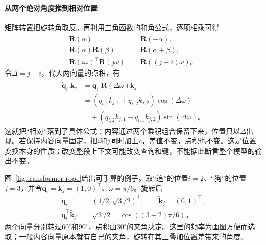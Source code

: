 \paragraph{从两个绝对角度推到相对位置}
矩阵转置把旋转角取反。再利用三角函数的和角公式，逐项相乘可得
\begin{equation}
  \begin{aligned}
    \bm R(\alpha)^{\top}&=\bm R(-\alpha),\\
    \bm R(\alpha)\bm R(\beta)&=\bm R(\alpha+\beta),\\
    \bm R(i\omega)^{\top}\bm R(j\omega)
      &=\bm R((j-i)\omega)\text{。}
  \end{aligned}
  \label{eq:transformer-rope-composition}
\end{equation}
令$\Delta=j-i$，代入两向量的点积，有
\begin{equation}
  \begin{aligned}
    \widetilde{\bm q}_i^{\top}\widetilde{\bm k}_j
      &=\bm q_i^{\top}\bm R(\Delta\omega)\bm k_j\\
      &=(q_{i,1}k_{j,1}+q_{i,2}k_{j,2})\cos(\Delta\omega)\\
      &\quad +(q_{i,2}k_{j,1}-q_{i,1}k_{j,2})\sin(\Delta\omega)\text{。}
  \end{aligned}
  \label{eq:transformer-rope-two-dimensional}
\end{equation}
这就把“相对”落到了具体公式：内容通过两个乘积组合保留下来，位置只以$\Delta$出现。若保持内容向量固定，把$i$和$j$同时加上$c$，差值不变，点积也不变。这是位置变换本身的性质；改变整段上下文可能改变查询和键，不能据此断言整个模型的输出不变。

图~\ref{fig:transformer-rope}给出可手算的例子。取“追”的位置$i=2$、“狗”的位置$j=3$，并令$\bm q_i=\bm k_j=(1,0)^{\top}$、$\omega=\pi/6$。旋转后
\[
  \begin{aligned}
    \widetilde{\bm q}_i&=(1/2,\sqrt3/2)^{\top},\qquad
    \widetilde{\bm k}_j=(0,1)^{\top},\\
    \widetilde{\bm q}_i^{\top}\widetilde{\bm k}_j
      &=\sqrt3/2=\cos((3-2)\pi/6)\text{。}
  \end{aligned}
\]
两个向量分别转过$60^\circ$和$90^\circ$，点积由$30^\circ$的夹角决定。这里的频率为画图方便而选取；一般内容向量原本就有自己的夹角，旋转在其上叠加位置差带来的角度。

